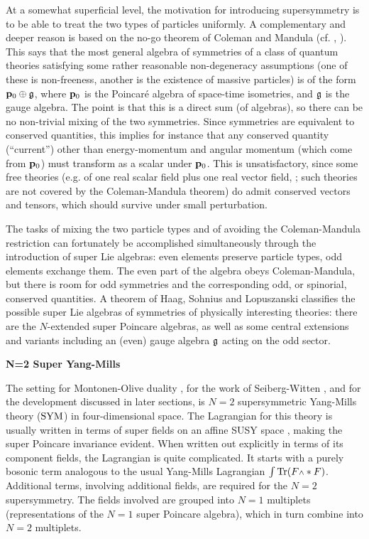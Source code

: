At a somewhat superficial level, the motivation for
introducing supersymmetry is to be able to treat the two
types of particles uniformly.
A complementary and deeper reason is based on the no-go
theorem of Coleman and Mandula
(cf. \cite{Fr}, \cite{WB}).
This says that the most general algebra of symmetries of a
class of quantum theories satisfying some rather reasonable
non-degeneracy assumptions (one of these is non-freeness,
another is the existence of massive
particles) is of the form $\bold{p}_0\oplus \frak{g}$, where
$\bold{p}_0$ is the Poincar\'e algebra of space-time isometries,
and $\frak{g}$ is the gauge algebra.
The point is that this is a direct sum (of algebras), so
there can be no non-trivial mixing of the two symmetries.
Since symmetries are equivalent to conserved quantities,
this implies for instance that any conserved quantity
(``current'') other than energy-momentum and angular
momentum (which come from $\bold{p}_0$) must transform as a
scalar under $\bold{p}_0$.
This is unsatisfactory, since some free theories (e.g. of
one real scalar field plus one real vector field, 
\cite{Fr}; such
theories are not covered by the Coleman-Mandula theorem) do
admit conserved vectors and tensors, which should survive
under small perturbation.

The tasks of mixing the two particle types and of avoiding
the Coleman-Mandula restriction can fortunately be
accomplished simultaneously through the introduction of
super Lie algebras: even elements preserve particle types,
odd elements exchange them.
The even part of the algebra obeys Coleman-Mandula, but
there is room for odd symmetries and the corresponding odd,
or spinorial, conserved quantities.
A theorem of Haag, Sohnius and Lopuszanski classifies the
possible super Lie algebras of symmetries of physically
interesting theories: there are the $N$-extended super
Poincare algebras, as well as some central extensions and
variants including an (even) gauge algebra $\frak{g}$ acting on
the odd sector.

\medskip\noindent
{\bf N=2 Super Yang-Mills}

The setting for Montonen-Olive duality \cite{MO}, for the work
of Seiberg-Witten \cite{SW1, SW2}, and for the development
discussed in later sections, is $N=2$ supersymmetric
Yang-Mills theory ($\text{\rm SYM}$) in four-dimensional space.
The Lagrangian for this theory is usually written in terms
of super fields on an affine SUSY space \cite{WB}, making
the super Poincare invariance evident.
When written out explicitly in terms of its component
fields, the Lagrangian is quite complicated.
It starts with a purely bosonic term analogous to the usual
Yang-Mills Lagrangian $\int\Tr(F\w*F)$.
Additional terms, involving additional fields, are required
for the $N=2$ supersymmetry.
The fields involved are grouped into $N=1$ multiplets
(representations of the $N=1$ super Poincare algebra), which
in turn combine into $N=2$ multiplets.

